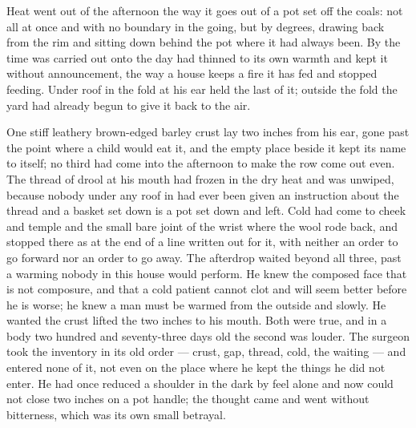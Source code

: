 Heat went out of the afternoon the way it goes out of a pot set off the coals: not all at once and with no boundary in the going, but by degrees, drawing back from the rim and sitting down behind the pot where it had always been. By the time  was carried out onto  the day had thinned to its own warmth and kept it without announcement, the way a house keeps a fire it has fed and stopped feeding. Under  roof in  the fold at his ear held the last of it; outside the fold the yard had already begun to give it back to the air.

One stiff leathery brown-edged barley crust lay two inches from his ear, gone past the point where a child would eat it, and the empty place beside it kept its name to itself; no third had come into the afternoon to make the row come out even. The thread of drool at his mouth had frozen in the dry heat and was unwiped, because nobody under any roof in  had ever been given an instruction about the thread and a basket set down is a pot set down and left. Cold had come to cheek and temple and the small bare joint of the wrist where the wool rode back, and stopped there as at the end of a line written out for it, with neither an order to go forward nor an order to go away. The afterdrop waited beyond all three, past a warming nobody in this house would perform. He knew the composed face that is not composure, and that a cold patient cannot clot and will seem better before he is worse; he knew a man must be warmed from the outside and slowly. He wanted the crust lifted the two inches to his mouth. Both were true, and in a body two hundred and seventy-three days old the second was louder. The surgeon took the inventory in its old order --- crust, gap, thread, cold, the waiting --- and entered none of it, not even on the place where he kept the things he did not enter. He had once reduced a shoulder in the dark by feel alone and now could not close two inches on a pot handle; the thought came and went without bitterness, which was its own small betrayal.

